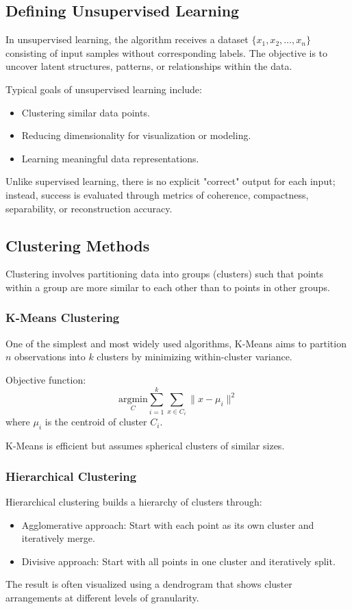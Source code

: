 \documentclass[openany]{book}
\begin{document}
\subsection{Defining Unsupervised Learning}
In unsupervised learning, the algorithm receives a dataset \( \{ x_1, x_2, 
\dots, x_n \} \) consisting of input samples without corresponding labels. The 
objective is to uncover latent structures, patterns, or relationships within 
the data.

Typical goals of unsupervised learning include:
\begin{itemize}
    \item Clustering similar data points.
    \item Reducing dimensionality for visualization or modeling.
    \item Learning meaningful data representations.
\end{itemize}

Unlike supervised learning, there is no explicit "correct" output for each 
input; instead, success is evaluated through metrics of coherence, compactness, 
separability, or reconstruction accuracy.

\subsection{Clustering Methods}
Clustering involves partitioning data into groups (clusters) such that points 
within a group are more similar to each other than to points in other groups.

\subsubsection{K-Means Clustering}
One of the simplest and most widely used algorithms, K-Means aims to partition 
\( n \) observations into \( k \) clusters by minimizing within-cluster 
variance.

Objective function:
\[
\underset{C}{\text{argmin}} \sum_{i=1}^{k} \sum_{x \in C_i} \| x - \mu_i \|^2
\]
where \( \mu_i \) is the centroid of cluster \( C_i \).

K-Means is efficient but assumes spherical clusters of similar sizes.

\subsubsection{Hierarchical Clustering}
Hierarchical clustering builds a hierarchy of clusters through:
\begin{itemize}
    \item Agglomerative approach: Start with each point as its own cluster and 
    iteratively merge.
    \item Divisive approach: Start with all points in one cluster and 
    iteratively split.
\end{itemize}
The result is often visualized using a dendrogram that shows cluster 
arrangements at different levels of granularity.
\end{document}
